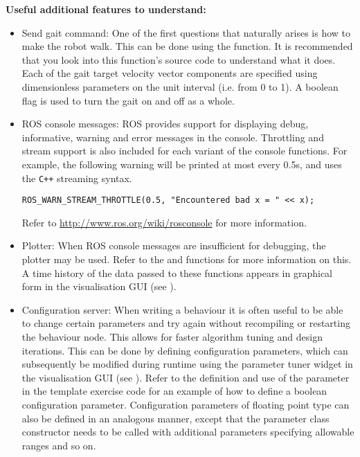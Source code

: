 \documentclass[runningheads,a4paper,obeyspaces]{llncs}
\newcommand{\code}[1]{\protect\path{#1}}
\begin{document}
\noindent\textbf{Useful additional features to understand:}
\begin{itemize}
\setlength{\itemsep}{5pt}
\item \textsf{Send gait command}: One of the first questions that naturally
arises is how to make the robot walk. This can be done using the
\code{sendGaitCommand()} function. It is recommended that you look into this
function's source code to understand what it does. Each of the gait target
velocity vector components are specified using dimensionless parameters on the
unit interval (i.e. from 0 to 1). A boolean flag is used to turn the gait on and
off as a whole.
\item \textsf{ROS console messages}: ROS provides support for displaying debug,
informative, warning and error messages in the console. Throttling and stream
support is also included for each variant of the console functions. For example,
the following warning will be printed at most every 0.5s, and uses the
\verb!C++! streaming syntax.
\begin{verbatim}
ROS_WARN_STREAM_THROTTLE(0.5, "Encountered bad x = " << x);
\end{verbatim}
Refer to \url{http://www.ros.org/wiki/rosconsole} for more information. 
\item \textsf{Plotter}: When ROS console messages are insufficient for
debugging, the plotter may be used. Refer to the \code{plotScalar()} and
\code{plotVector()} functions for more information on this. A time history of
the data passed to these functions appears in graphical form in the
visualisation GUI (see \emph{}).
\item \textsf{Configuration server}: When writing a behaviour it is often useful
to be able to change certain parameters and try again without recompiling or
restarting the behaviour node. This allows for faster algorithm tuning and
design iterations. This can be done by defining configuration parameters, which
can subsequently be modified during runtime using the parameter tuner widget in
the visualisation GUI (see \emph{}). Refer to the
definition and use of the \code{m_be_run()} parameter in the template exercise
code for an example of how to define a boolean configuration parameter.
Configuration parameters of floating point type can also be defined in an
analogous manner, except that the parameter class constructor needs to be called
with additional parameters specifying allowable ranges and so on.
\end{itemize}
\end{document}
